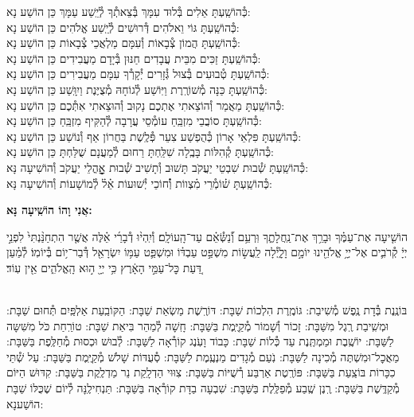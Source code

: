 \documentclass[twoside, openany, parskip=half, 11pt]{book}
\begin{document}
\begin{small}
כְּ֯הוֹשַֽׁעְתָּ אֵלִים בְּ֯לוּד עִמָּךְ בְּ֯צֵאתְ֯ךָ לְ֯יֵֽשַׁע עַמָּךְ \hfill כֵּן הוֹשַׁע נָא: \\
כְּ֯הוֹשַֽׁעְתָּ גּוֹי וֵאלֹהִים דְּ֯רוּשִׁים לְ֯יֵֽשַׁע אֱלֹהִים \hfill כֵּן הוֹשַׁע נָא: \\
כְּ֯הוֹשַֽׁעְתָּ הֲמוֹן צְ֯בָאוֹת וְ֯עִמָּם מַלְאֲכֵי צְ֯בָאוֹת \hfill כֵּן הוֹשַׁע נָא: \\
כְּ֯הוֹשַֽׁעְתָּ זַכִּים מִבֵּית עֲבָדִים חַנּוּן בְּ֯יָדָם מַעֲבִידִים \hfill כֵּן הוֹשַׁע נָא: \\
כְּ֯הוֹשַֽׁעְתָּ טְ֯בוּעִים בְּ֯צוּל גְּ֯זָרִים יְ֯קָרְ֯ךָ עִמָּם מַעֲבִירִים \hfill כֵּן הוֹשַׁע נָא: \\
כְּ֯הוֹשַֽׁעְתָּ כַּנָּה מְ֯שׁוֹרֶֽרֶת וַיּֽוֹשַׁע לְ֯גוֹחָהּ מְ֯צֻיֶּנֶת וַיִוָּֽשַׁע \hfill כֵּן הוֹשַׁע נָא: \\
כְּ֯הוֹשַֽׁעְתָּ מַאֲמַר וְ֯הוֹצֵאתִי אֶתְכֶם נָקוּב וְ֯הוּצֵאתִי אִתְּ֯כֶם \hfill כֵּן הוֹשַׁע נָא:\\
כְּ֯הוֹשַֽׁעְתָּ סוֹבֲבֵי מִזְבֵּֽחַ עוֹמְ֯סֵי עֲרָבָה לְ֯הַקִּיף מִזְבֵּֽחַ \hfill כֵּן הוֹשַׁע נָא: \\
כְּ֯הוֹשַֽׁעְתָּ פִּלְאֵי אָרוֹן כְּ֯הֻפְשַׁע צִעֵר פְּ֯לֶֽשֶׁת בַּחֲרוֹן אַף וְ֯נוֹשַׁע \hfill כֵּן הוֹשַׁע נָא:\\
כְּ֯הוֹשַֽׁעְתָּ קְ֯הִלּוֹת בָּבֶֽלָה שִׁלַּֽחְתָּ רַחוּם לְ֯מַעֲנָם שֻׁלַּחְתָּ \hfill כֵּן הוֹשַׁע נָא:\\

כְּ֯הוֹשַֽׁעְתָּ שְׁ֯בוּת שִׁבְטֵי יַעֲקֹב תָּשׁוּב וְ֯תָשִׁיב שְׁ֯בוּת אׇׇׇׇׇׇׇׇהֳלֵי יַעֲקֹב \hfill וְ֯הוֹשִׁיעָה נָּא:\\
כְּ֯הוֹשַֽׁעְתָּ שׁ֗וֹמְ֯רֵי מִ֗צְווֹת וְ֯֗חוֹכֵי יְ֯שׁוּעוֹת אֵ֗ל֗ לְ֯מוֹשָׁעוֹת \hfill וְ֯הוֹשִׁיעָה נָּא:

\end{small}

\begin{large}
\textbf{אֲנִי וָהוֹ הוֹשִֽׁיעָה נָּא:}
\end{large}

הוֹשִׁ֤יעָה אֶת־עַמֶּ֗ךָ וּבָרֵ֥ךְ אֶת־נַֽחֲלָתֶ֑ךָ וּֽרְעֵ֥ם וְ֯֝נַשְּׂ֯אֵ֗ם עַד־הָֽעוֹלָֽם׃ וְ֯יִֽהְי֨וּ דְ֯בָרַ֜י אֵ֗לֶּה אֲשֶׁ֤ר הִתְחַנַּ֨נְתִּי֙ לִפְנֵ֣י יְיָ֔ קְ֯רֹבִ֛ים אֶל־יְיָ֥ אֱלֹהֵ֖ינוּ יוֹמָ֣ם וָלָ֑יְ֯לָה לַֽעֲשׂ֣וֹת מִשְׁפַּ֣ט עַבְדּ֗וֹ וּמִשְׁפַּ֛ט עַמּ֥וֹ יִשְׂרָאֵ֖ל דְּ֯בַר־י֥וֹם בְּ֯יוֹמֽוֹ׃ לְ֯מַ֗עַן דַּ֚עַת כׇּל־עַמֵּ֣י הָאָ֔רֶץ כִּ֥י יְיָ֖ ה֣וּא הָֽאֱלֹהִ֑ים אֵ֖ין עֽוֹד׃

\sepline

\\
בּוֹנֶֽנֶת בְּ֯דָת נֶֽפֶשׁ מְ֯שִׁיבַת: גּוֹמֶֽרֶת הִלְכוֹת שַׁבָּת: דּוֹרֶֽשֶׁת מַשְׂאַת שַׁבָּת: הַקּוֹבַֽעַת אַלְפַּֽיִם תְּ֯חוּם שַׁבָּת: וּמְשִֽׁיבַת רֶֽגֶל מִשַּׁבָּת: זָכוֹר וְ֯שָׁמוֹר מְ֯קַיֶּֽמֶת בַּשַּׁבָּת: חָֽשָׁה לְ֯מַהֵר בִּיאַת שַׁבָּת: טוֹרַֽחַת כֹּל מִשִּׁשָּה לַשַּׁבָּת: יוֹשֶֽׁבֶת וּמַמְתֶּֽנֶת עַד כְּ֯לוֹת שַׁבָּת: כָּבוֹד וָעֹֽנֶג קוֹרְ֯אָה לַשַּׁבָּת: לְ֯בוּשׁ וּכְסוּת מְ֯חַלֶּֽפֶת בַּשַּׁבָּת: מַאֲכׇל־וּמִשְׁתֶּה מְ֯כִינָה לַשַּׁבָּת: נֹֽעַם מְ֯גָדִים מַנְעֶֽמֶת לַשַּׁבָּת: סְ֯עֻדּוֹת שָׁלֹשׁ מְ֯קַיֶּֽמֶת בַּשַּׁבָּת: עַל שְׁ֯תֵּי כִכָּרוֹת בּוֹצַֽעַת בַּשַּׁבָּת: פּוֹרֶֽטֶת אַרְבַּע רְ֯שֻׁיּוֹת בַּשַּׁבָּת: צִוּוּי הַדְלָֽקַת נֵר מַדְלֶֽקֶת בַּשַּׁבָּת: קִדּוּשׁ הַיּוֹם מְ֯קַדֶּֽשֶׁת בַּשַּׁבָּת: רֶֽנֶן שֶֽׁבַע מְ֯פַלֶּֽלֶת בַּשַּׁבָּת: שִׁבְעָה בַדָּת קוֹרְ֯אָה בַּשַּׁבָּת: תַּנְחִילֶֽנָּה לְ֯יוֹם שֶׁכֻּלּוֹ שַׁבָּת הוֹשַׁענָא:
\end{document}
